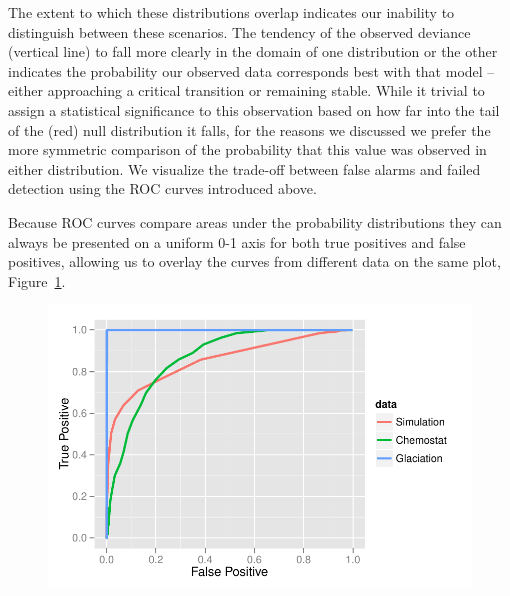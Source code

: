 \documentclass[authoryear,review,11pt]{elsarticle}
\begin{document}
The extent to which these distributions overlap indicates our inability to distinguish between these scenarios.  
The tendency of the observed deviance (vertical line) to fall more clearly in the domain of one distribution or the other 
indicates the probability our observed data corresponds best with that model  -- 
either approaching a critical transition or remaining stable.  
While it trivial to assign a statistical significance to this observation based 
on how far into the tail of the (red) null distribution it falls, 
for the reasons we discussed we prefer the more symmetric comparison of the probability that 
this value was observed in either distribution.  
We visualize the trade-off between false alarms and failed detection using the ROC curves introduced above.  

Because ROC curves compare areas under the probability distributions they can always be presented on a uniform 0-1 axis
for both true positives and false positives, allowing us to overlay the curves from different data on the same plot,
Figure~\ref{fig:rocdata}.

 \begin{figure}
   \begin{center}
     \includegraphics[width=\linewidth]{figures/rocplot.pdf}
     \caption{ }
     \label{fig:rocdata}
  \end{center}
 \end{figure}


\end{document}
